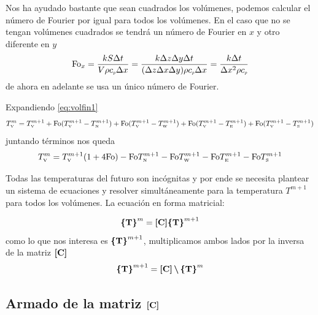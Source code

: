 \documentclass[11pt, titlepage]{article}
\begin{document}
Nos ha ayudado bastante que sean cuadrados los volúmenes, podemos calcular el número de Fourier por igual para todos los volúmenes. En el caso que no se tengan volúmenes cuadrados se tendrá un número de Fourier en $x$ y otro diferente en $y$
\begin{equation*}
    {\mathrm{Fo}}_x= \frac{k S \Delta t}{V \rho {c_{\textit{\tiny p}}} \Delta x} = \frac{k \Delta z \Delta y \Delta t}{(\Delta z \Delta x \Delta y) \rho {c_{\textit{\tiny p}}} \Delta x} = \frac{k \Delta t}{ \Delta x^2 \rho {c_{\textit{\tiny p}}}}
\end{equation*}
de ahora en adelante se usa un único número de Fourier.

Expandiendo \eqref{eq:volfin1}
\begin{equation}
    T_{\text{\tiny V}}^m =T_{\text{\tiny V}}^{m+1} + {\mathrm{Fo}}(T_{\text{\tiny V}}^{m+1}-T_{\text{\tiny N}}^{m+1})+{\mathrm{Fo}}(T_{\text{\tiny V}}^{m+1}-T_{\text{\tiny W}}^{m+1})+{\mathrm{Fo}}(T_{\text{\tiny V}}^{m+1}-T_{\text{\tiny E}}^{m+1})+{\mathrm{Fo}}(T_{\text{\tiny V}}^{m+1}-T_{\text{\tiny S}}^{m+1})
\end{equation}
juntando términos nos queda
\begin{equation} \label{eq:volumenesfinitosSolido}
    T_{\text{\tiny V}}^m = T_{\text{\tiny V}}^{m+1}(1+4{\mathrm{Fo}}) - {\mathrm{Fo}} T_{\text{\tiny N}}^{m+1} - {\mathrm{Fo}} T_{\text{\tiny W}}^{m+1} - {\mathrm{Fo}} T_{\text{\tiny E}}^{m+1} - {\mathrm{Fo}} T_{\text{\tiny S}}^{m+1}
\end{equation}

Todas las temperaturas del futuro son incógnitas y por ende se necesita plantear un sistema de ecuaciones y resolver simultáneamente para la temperatura $T^{m+1}$ para todos los volúmenes. La ecuación en forma matricial:

\[
\boldsymbol{\{ } \boldsymbol{ \mathrm{T} } \boldsymbol{\} }^{m} =  \boldsymbol{[ } \boldsymbol{ \mathrm{C} } \boldsymbol{] } \boldsymbol{\{ } \boldsymbol{ \mathrm{T} } \boldsymbol{\} }^{m+1}
\]
como lo que nos interesa es $\boldsymbol{\{ } \boldsymbol{ \mathrm{T} } \boldsymbol{\} }^{m+1}$, multiplicamos ambos lados por la inversa de la matriz $\boldsymbol{[ } \boldsymbol{ \mathrm{C} } \boldsymbol{] }$
\begin{equation}
\boldsymbol{\{ } \boldsymbol{ \mathrm{T} } \boldsymbol{\} }^{m+1} = \boldsymbol{[ } \boldsymbol{ \mathrm{C} } \boldsymbol{] } \,{\boldsymbol{\backslash}}\, \boldsymbol{\{ } \boldsymbol{ \mathrm{T} } \boldsymbol{\} }^{m} 
\end{equation}

\subsection[Armado de la matriz \textbf{C}]{Armado de la matriz $\boldsymbol{[ } \boldsymbol{ \mathrm{C} } \boldsymbol{] }$}
\end{document}
